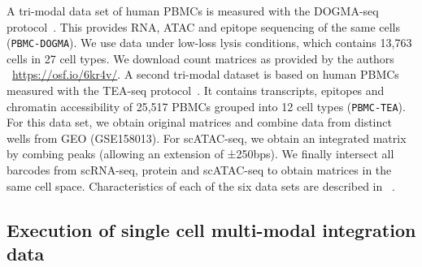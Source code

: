 A tri-modal data set of human PBMCs is measured with the DOGMA-seq protocol~\cite{mimitou2021scalable}. This provides RNA, ATAC and epitope sequencing of the same cells ({\texttt{PBMC-DOGMA}}). We use data under low-loss lysis conditions, which contains 13,763 cells in 27 cell types. We download count matrices as provided by the authors ~\url{https://osf.io/6kr4v/}. A second tri-modal dataset is based on human PBMCs measured with the TEA-seq protocol~\cite{swanson2021simultaneous}. It contains transcripts, epitopes and chromatin accessibility of 25,517 PBMCs grouped into 12 cell types ({\texttt{PBMC-TEA}}). For this data set, we obtain original matrices and combine data from distinct wells from GEO (GSE158013). For scATAC-seq, we obtain an integrated matrix by combing peaks (allowing an extension of ±250bps). We finally intersect all barcodes from scRNA-seq, protein and scATAC-seq to obtain matrices in the same cell space. Characteristics of each of the six data sets are described in ~.


\subsection{Execution of single cell multi-modal integration data}
